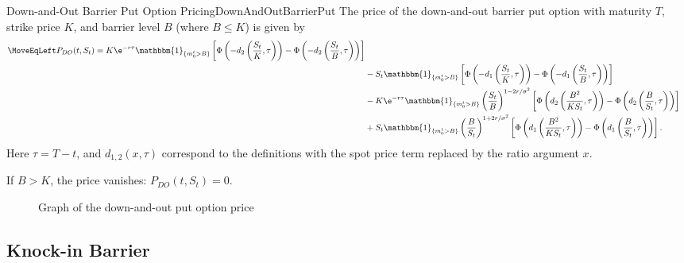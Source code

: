 \begin{prop}{Down-and-Out Barrier Put Option Pricing}{DownAndOutBarrierPut}
    The price of the down-and-out barrier put option with maturity $T$, strike price $K$, and barrier level $B$ (where $B \le K$) is given by
    \begin{align}
        \MoveEqLeft P_{DO}(t, S_t) = K \e^{-r\tau} \mathbbm{1}_{\{m_0^t > B\}} \left[ \Phi \left( -d_2 \left( \frac{S_t}{K}, \tau \right) \right) - \Phi \left( -d_2 \left( \frac{S_t}{B}, \tau \right) \right) \right] \nonumber \\
        &- S_t \mathbbm{1}_{\{m_0^t > B\}} \left[ \Phi \left( -d_1 \left( \frac{S_t}{K}, \tau \right) \right) - \Phi \left( -d_1 \left( \frac{S_t}{B}, \tau \right) \right) \right] \nonumber \\
        &- K \e^{-r\tau} \mathbbm{1}_{\{m_0^t > B\}} \left( \frac{S_t}{B} \right)^{1-2r/\sigma^2} \left[ \Phi \left( d_2 \left( \frac{B^2}{K S_t}, \tau \right) \right) - \Phi \left( d_2 \left( \frac{B}{S_t}, \tau \right) \right) \right] \nonumber \\
        &+ S_t \mathbbm{1}_{\{m_0^t > B\}} \left( \frac{B}{S_t} \right)^{1+2r/\sigma^2} \left[ \Phi \left( d_1 \left( \frac{B^2}{K S_t}, \tau \right) \right) - \Phi \left( d_1 \left( \frac{B}{S_t}, \tau \right) \right) \right].
    \end{align}
    Here $\tau = T-t$, and $d_{1,2}(x, \tau)$ correspond to the definitions with the spot price term replaced by the ratio argument $x$.

    If $B > K$, the price vanishes: $P_{DO}(t, S_t) = 0$.
\end{prop}

\begin{figure}[H]
    \centering
    
    \caption{Graph of the down-and-out put option price}
    \label{fig:downAndOutPutBarrierSurface}
\end{figure}

\clearpage
\subsection{Knock-in Barrier}